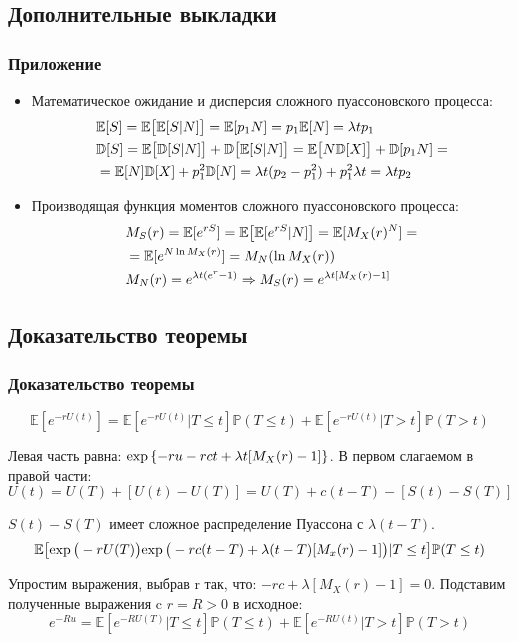 \documentclass[10pt]{beamer}
\newcommand\Exp{{\rm exp \,}}
\newcommand\E{\mathbb{E}}
\newcommand\D{\mathbb{D}}
\newcommand\Pro{\mathbb{P}}
\begin{document}
\subsection{Дополнительные выкладки}
\begin{frame}
\frametitle{Приложение}
\begin{itemize}
    \item Математическое ожидание и дисперсия сложного пуассоновского процесса:
    \begin{align}
    & \E[S] = \E\big[\E[S|N]\big]=\E[p_1 N] = p_1\E[N] = \lambda t p_1 \\
    & \D[S] = \E\big[\D[S|N]\big] + \D\big[\E[S|N]\big] = \E\big[N\D[X]\big] + \D[p_1N] =\notag \\
    & = \E[N]\D[X] + p_1 ^2 \D[N] = \lambda t (p_2 - p_1^2) + p_1^2 \lambda t = \lambda t p_2
    \end{align}
    \item Производящая функция моментов сложного пуассоновского процесса:
    \begin{align}
    & M_S (r) = \mathbb{E}[e^{rS}]=\mathbb{E}\big[\mathbb{E}[e^{rS}|N]\big]=\mathbb{E}[M_X (r)^N]=\notag \\
    & = \mathbb{E}[e^{N \ln{M_X (r)}}]= M_N (\ln{M_X (r)}) \\
    & M_N (r) = e^{\lambda t(e^r - 1)} \Rightarrow M_S (r) = e^{\lambda t[M_X (r) - 1]}
    \end{align}
\end{itemize}
\end{frame}


\subsection{Доказательство теоремы}
\begin{frame}
\frametitle{Доказательство теоремы}
\begin{equation}
\E[e^{-rU(t)}] = \E[e^{-rU(t)}|T \leq t]\Pro(T \leq t) + \E[e^{-rU(t)}|T > t]\Pro(T > t)
\end{equation}

Левая часть равна: $\Exp\{-ru - rct + \lambda t [M_X(r) - 1]\}$.
В первом слагаемом в правой части:
\begin{equation}
U(t) = U(T) + [U(t) - U(T)] =  U(T) + c(t - T) - [S(t) - S(T)]
\end{equation}

$S(t) - S(T)$ имеет сложное распределение Пуассона с $\lambda (t -T)$.
\begin{equation}
\E\big[\Exp\big(-rU(T)\big)\Exp\big(-rc(t-T) + \lambda (t - T)[M_x(r) - 1]\big)|T \leq t\big] 
\Pro (T \leq t)
\end{equation}

Упростим выражения, выбрав r так, что: $-rc + \lambda [M_X(r) - 1] = 0$.
Подставим полученные выражения c $r = R > 0$ в исходное:
\begin{equation}
e^{-Ru} = \E[e^{-RU(T)}|T \leq t]\Pro(T \leq t) + \E[e^{-RU(t)}|T > t]\Pro(T > t)
\end{equation}
\end{frame}
\end{document}
